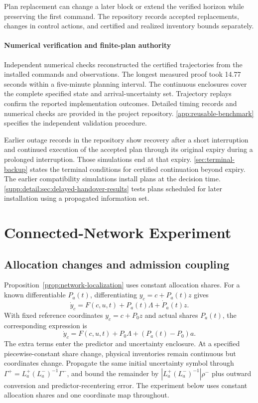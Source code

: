 \documentclass[preprint,12pt]{elsarticle}
\newcommand{\appref}[1]{\ref{#1}}
\begin{document}
Plan replacement can change a later block or extend the verified horizon while
preserving the first command. The repository records accepted replacements,
changes in control actions,
and certified and realized inventory bounds separately.

\paragraph{Numerical verification and finite-plan authority}
\label{sec:new-numerical-audit}
Independent numerical checks reconstructed the certified trajectories
from the installed commands and observations. The longest measured proof
took 14.77 seconds within a five-minute planning interval. The continuous
enclosures cover the complete specified state and arrival-uncertainty set.
Trajectory replays confirm the reported implementation outcomes. Detailed
timing records and numerical checks are provided in the project
repository. \appref{app:reusable-benchmark} specifies the independent
validation procedure.

Earlier outage records in the repository show recovery after a short
interruption and continued execution of the accepted plan through its
original expiry during a prolonged interruption. Those simulations end
at that expiry. \appref{sec:terminal-backup} states the terminal
conditions for certified continuation beyond expiry. The earlier
compatibility simulations install plans at the decision time.
\appref{supp:detail:sec:delayed-handover-results} tests plans scheduled
for later installation using a propagated information set.

\FloatBarrier
\section{Connected-Network Experiment}
\label{app:network-transfer}

\subsection{Allocation changes and admission coupling}

Proposition~\ref{prop:network-localization} uses constant allocation shares.
For a known differentiable $P_a(t)$, differentiating $y_c=c+P_a(t)z$ gives
\begin{equation}
 \dot y_c=F(c,u,t)+P_a(t)\Lambda+\dot P_a(t)z.
 \label{supp:detail:eq:network-varying-allocation}
\end{equation}
With fixed reference coordinates $y_c=c+P_0z$ and actual shares $P_a(t)$,
the corresponding expression is
\begin{equation}
 \dot y_c=F(c,u,t)+P_0\Lambda+(P_a(t)-P_0)a.
 \label{supp:detail:eq:network-uncertain-allocation}
\end{equation}
The extra terms enter the predictor and uncertainty enclosure. At a specified
piecewise-constant share change, physical inventories remain continuous but
coordinates change. Propagate the same initial uncertainty symbol through
$\Gamma^+=L_a^+(L_a^-)^{-1}\Gamma^-$, and bound the remainder by
$|L_a^+(L_a^-)^{-1}|\rho^-$ plus outward conversion and predictor-recentering
error. The experiment below uses constant allocation shares and one coordinate
map throughout.
\end{document}
